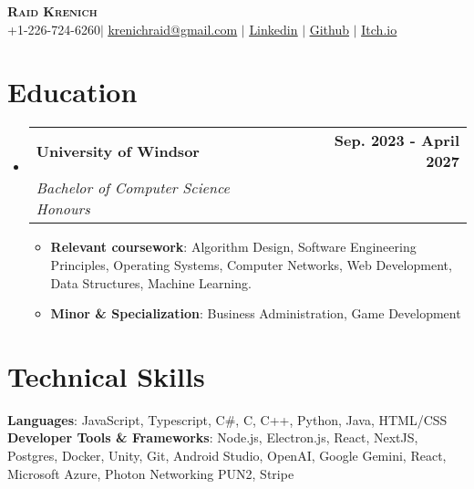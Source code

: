 \documentclass[letterpaper,11pt]{article}
\makeatletter
\newcommand{\resumeItem}[1]{
  \item\small{
    {#1 \vspace{-2pt}}
  }
}
\newcommand{\resumeSubheading}[4]{
  \vspace{-2pt}\item
    \begin{tabular*}{0.97\textwidth}[t]{l@{\extracolsep{\fill}}r}
      \textbf{#1} & #2 \\
      \textit{\small#3} & \textit{\small #4} \\
    \end{tabular*}\vspace{-7pt}
}
\newcommand{\resumeSubHeadingListStart}{\begin{itemize}[leftmargin=0.15in, label={}]}
\newcommand{\resumeSubHeadingListEnd}{\end{itemize}}
\newcommand{\resumeItemListStart}{\begin{itemize}}
\newcommand{\resumeItemListEnd}{\end{itemize}\vspace{-5pt}}
\makeatother
\begin{document}
\begin{center}
    \textbf{\Huge \scshape Raid Krenich} \\ \vspace{1pt}
    \small +1-226-724-6260$|$ \href{mailto:krenichraid@gmail.com}{\underline{krenichraid@gmail.com}} $|$ 
    \href{https://www.linkedin.com/in/krenich}{\underline{Linkedin}} $|$
    \href{https://github.com/Krenich09}{\underline{Github}} $|$
    \href{https://rq1d.itch.io/}{\underline{Itch.io}}
\end{center}

%


\section{Education}
  \resumeSubHeadingListStart
    \resumeSubheading
      {University of Windsor}{\textbf{Sep. 2023 - April 2027}}
      {Bachelor of Computer Science Honours}{}
        \resumeItemListStart{}
          \resumeItem{\textbf{Relevant coursework}: Algorithm Design, Software Engineering Principles, Operating Systems, Computer Networks, Web Development, Data Structures, Machine Learning.}
          \resumeItem{\textbf{Minor \& Specialization}: Business Administration, Game Development}
        \resumeItemListEnd
  \resumeSubHeadingListEnd

%
\section{Technical Skills}
 \begin{itemize}[leftmargin=0.15in, label={}]
    \small{\item{
     \textbf{Languages}{: JavaScript, Typescript, C\#, C, C++, Python, Java, HTML/CSS} \\
     \textbf{Developer Tools \& Frameworks}{: Node.js, Electron.js, React, NextJS, Postgres, Docker, Unity, Git, Android Studio, OpenAI, Google Gemini, React, Microsoft Azure, Photon Networking PUN2, Stripe}
    }}
 \end{itemize}
\end{document}
